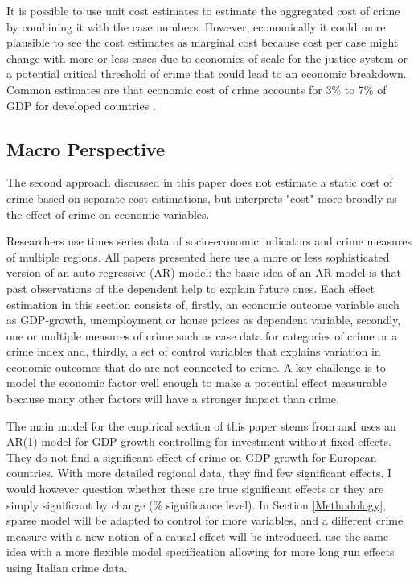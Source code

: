 \documentclass[a4paper,12pt]{article}
\begin{document}
It is possible to use unit cost estimates to estimate the aggregated cost of crime by combining it with the case numbers. However, economically it could more plausible to see the cost estimates as marginal cost because cost per case might change with more or less cases due to economies of scale for the justice system or a potential critical threshold of crime that could lead to an economic breakdown. Common estimates are that economic cost of crime accounts for 3\% to 7\% of GDP for developed countries \citep{kosten_nutzen_entorf}.


\subsection{Macro Perspective}
The second approach discussed in this paper does not estimate a static cost of crime based on separate cost estimations, but interprets "cost" more broadly as the effect of crime on economic variables. 

Researchers use times series data of socio-economic indicators and crime measures of multiple regions. All papers presented here use a more or less sophisticated version of an auto-regressive (AR) model: the basic idea of an AR model is that past observations of the dependent help to explain future ones. 
Each effect estimation in this section consists of, firstly, an economic outcome variable such as GDP-growth, unemployment or house prices as dependent variable, secondly, one or multiple measures of crime such as case data for categories of crime or a crime index and, thirdly, a set of control variables that explains variation in economic outcomes that do are not connected to crime. 
A key challenge is to model the economic factor well enough to make a potential effect measurable because many other factors will have a stronger impact than crime.

The main model for the empirical section of this paper stems from \cite{entorf} and uses an AR(1) model for GDP-growth controlling for investment without fixed effects. They do not find a significant effect of crime on GDP-growth for European countries. With more detailed regional data, they find few significant effects. I would however question whether these are true significant effects or they are simply significant by change (\% significance level).
In Section \ref{Methodology}, \cite{entorf} sparse model will be adapted to control for more variables, and a different crime measure with a new notion of a causal effect will be introduced.
\cite{detotto} use the same idea with a more flexible model specification allowing for more long run effects using Italian crime data.
\end{document}
